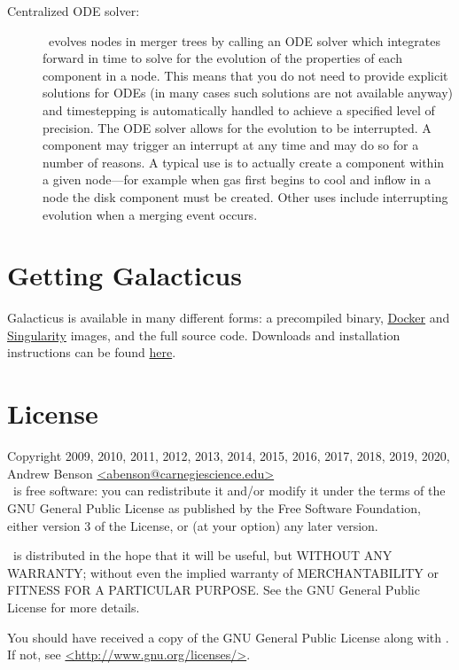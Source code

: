 \begin{description}
 \item [Centralized ODE solver:] \glc\ evolves nodes in merger trees by calling an ODE solver which integrates forward in time to solve for the evolution of the properties of each component in a node. This means that you do not need to provide explicit solutions for ODEs (in many cases such solutions are not available anyway) and timestepping is automatically handled to achieve a specified level of precision. The ODE solver allows for the evolution to be interrupted. A component may trigger an interrupt at any time and may do so for a number of reasons. A typical use is to actually create a component within a given node---for example when gas first begins to cool and inflow in a node the disk component must be created. Other uses include interrupting evolution when a merging event occurs.
\end{description}

\section{Getting Galacticus}

Galacticus is available in many different forms: a precompiled binary, \href{https://www.docker.com/}{Docker} and \href{https://sylabs.io/}{Singularity} images, and the full source code. Downloads and installation instructions can be found \href{https://github.com/galacticusorg/galacticus/wiki#how-do-i-install-and-use-galacticus}{here}.

\section{License}

Copyright 2009, 2010, 2011, 2012, 2013, 2014, 2015, 2016, 2017, 2018, 2019, 2020, Andrew Benson \href{mailto:abenson@carnegiescience.edu}{\normalfont \ttfamily <abenson@carnegiescience.edu>}\\

\glc\ is free software: you can redistribute it and/or modify
it under the terms of the GNU General Public License as published by
the Free Software Foundation, either version 3 of the License, or
(at your option) any later version.

\glc\ is distributed in the hope that it will be useful,
but WITHOUT ANY WARRANTY; without even the implied warranty of
MERCHANTABILITY or FITNESS FOR A PARTICULAR PURPOSE.  See the
GNU General Public License for more details.

You should have received a copy of the GNU General Public License
along with \glc.  If not, see \href{http://www.gnu.org/licenses/}{\normalfont \ttfamily <http://www.gnu.org/licenses/>}.
